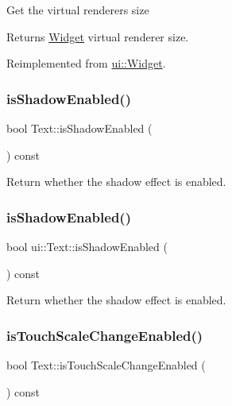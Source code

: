 Get the virtual renderer\textquotesingle{}s size \begin{DoxyReturn}{Returns}
\hyperlink{classui_1_1Widget}{Widget} virtual renderer size. 
\end{DoxyReturn}


Reimplemented from \hyperlink{classui_1_1Widget_a2ed0d41565593f78dc59c975d58a869e}{ui\+::\+Widget}.

\mbox{\label{classui_1_1Text_ab6aca46711275ba0c974eb5848a1734a}} 
\subsubsection{\texorpdfstring{is\+Shadow\+Enabled()}{isShadowEnabled()}\hspace{0.1cm}{\footnotesize\ttfamily [1/2]}}
{\footnotesize\ttfamily bool Text\+::is\+Shadow\+Enabled (\begin{DoxyParamCaption}{ }\end{DoxyParamCaption}) const}

Return whether the shadow effect is enabled. \mbox{\label{classui_1_1Text_ad32c3307ad54191c5815fb8879c3dee2}} 
\subsubsection{\texorpdfstring{is\+Shadow\+Enabled()}{isShadowEnabled()}\hspace{0.1cm}{\footnotesize\ttfamily [2/2]}}
{\footnotesize\ttfamily bool ui\+::\+Text\+::is\+Shadow\+Enabled (\begin{DoxyParamCaption}{ }\end{DoxyParamCaption}) const}

Return whether the shadow effect is enabled. \mbox{\label{classui_1_1Text_a182273c96f2c8a6006165cdff11f99da}} 
\subsubsection{\texorpdfstring{is\+Touch\+Scale\+Change\+Enabled()}{isTouchScaleChangeEnabled()}\hspace{0.1cm}{\footnotesize\ttfamily [1/2]}}
{\footnotesize\ttfamily bool Text\+::is\+Touch\+Scale\+Change\+Enabled (\begin{DoxyParamCaption}{ }\end{DoxyParamCaption}) const}

